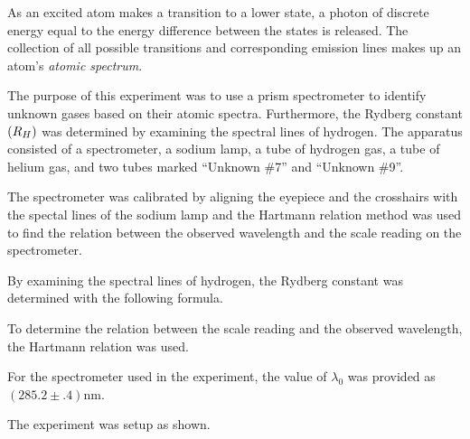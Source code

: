 \begin{paper}

As an excited atom makes a transition to a lower state, a photon of discrete energy equal to the energy difference between the states is released. The collection of all possible transitions and corresponding emission lines makes up an atom's \textit{atomic spectrum}.

The purpose of this experiment was to use a prism spectrometer to identify
unknown gases based on their atomic spectra. %
Furthermore, the Rydberg constant $\left( R_H\right)$ was determined by examining the
spectral lines of hydrogen.
The apparatus consisted of a spectrometer, a sodium lamp, a tube of hydrogen
gas, a tube of helium gas, and two tubes marked ``Unknown
\#7'' and ``Unknown \#9''.

The spectrometer was calibrated by aligning the eyepiece and the crosshairs with the spectal lines of the sodium lamp and the Hartmann relation method was used to find the
relation between the observed wavelength and the scale reading on the
spectrometer.

By examining the spectral lines of hydrogen, the Rydberg constant was
determined with the following formula.

\begin{paperwhere}
\end{paperwhere}

To determine the relation between the scale reading and the
observed wavelength, the Hartmann relation was used.\columnbreak

\begin{paperwhere}
\end{paperwhere}

For the spectrometer used in the experiment, the value of $\lambda_0$ was
provided as $(285.2\pm.4)\si{\nano\meter}$.

The experiment was setup as shown.


\end{paper}
